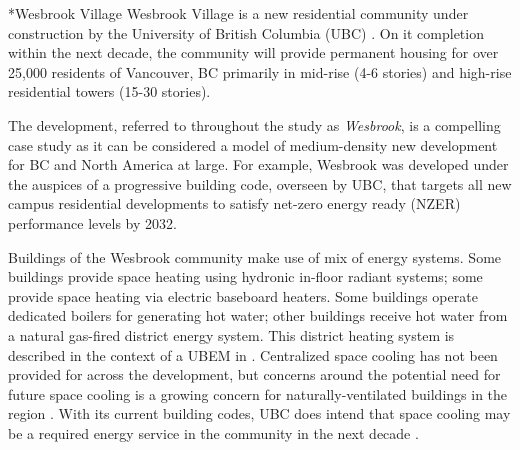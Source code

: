 \documentclass[twocolumn, a4paper,10pt]{article}
\makeatletter
\renewcommand\subsection{\@startsection{subsection}{1}{\z@}{\z@}{\z@}{\normalfont\normalsize\bfseries}}
\renewcommand\subsection{\@startsection{subsection}{1}{\z@}{\z@}{0.1pt}{\normalfont\normalsize\bfseries}}
\makeatother
\begin{document}

\subsection*{Wesbrook Village} 
Wesbrook Village is a new residential community under construction by the University of British Columbia (UBC) \citep{ubc_planning_ubc_2020_SR, ubc_planning_ubc_2020_wb}. On it completion within the next decade, the community will provide permanent housing for over 25,000 residents of Vancouver, BC primarily in mid-rise (4-6 stories) and high-rise residential towers (15-30 stories). 

 The development, referred to throughout the study as \textit{Wesbrook}, is a compelling case study as it can be considered a model of medium-density new development for BC and North America at large. For example, Wesbrook was developed under the auspices of a progressive building code, overseen by UBC, that targets all new campus residential developments to satisfy net-zero energy ready (NZER) performance levels by 2032.

 Buildings of the Wesbrook community make use of mix of energy systems. Some buildings provide space heating using hydronic in-floor radiant systems; some provide space heating via electric baseboard heaters. Some buildings operate dedicated boilers for generating hot water; other buildings receive hot water from a natural gas-fired district energy system.  This district heating system is described in the context of a UBEM in \citet{mccarty_accepted_2020}. Centralized space cooling has not been provided for across the development, but concerns around the potential need for future space cooling is a growing concern for naturally-ventilated buildings in the region \citep{rysanek_forecasting_2021}. With its current building codes, UBC does intend that space cooling may be a required energy service in the community in the next decade \citep{noauthor_residential_2021}.
\end{document}
